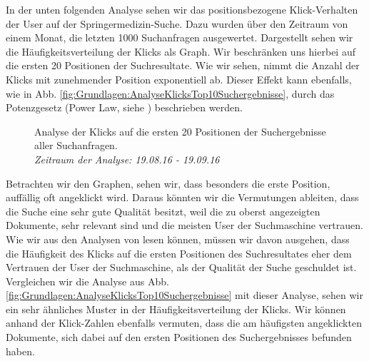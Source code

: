 
In der unten folgenden Analyse sehen wir das positionsbezogene Klick-Verhalten der User auf der Springermedizin-Suche. Dazu wurden über den Zeitraum von einem Monat, die letzten 1000 Suchanfragen ausgewertet. Dargestellt sehen wir die Häufigkeitsverteilung der Klicks als Graph. Wir beschränken uns hierbei auf die ersten 20 Positionen der Suchresultate. Wie wir sehen, nimmt die Anzahl der Klicks mit zunehmender Position exponentiell ab. Dieser Effekt kann ebenfalls, wie in Abb. \ref{fig:Grundlagen:AnalyseKlicksTop10Suchergebnisse}, durch das Potenzgesetz (Power Law, siehe \cite{PowerLaw}) beschrieben werden. 

\begin{figure}[H]
\centering 
\vspace{-1em}
\caption[Analyse der Klicks auf die ersten 20 Positionen der Suchergebnisse aller Suchanfragen. \textit{Zeitraum der Analyse: 19.08.16 - 19.09.16}]{Analyse der Klicks auf die ersten 20 Positionen der Suchergebnisse aller Suchanfragen. \\ \textit{Zeitraum der Analyse: 19.08.16 - 19.09.16}}
\label{fig:Grundlage:AnalyseKlicksPositionen}

\footnotesize
{}\topRanks
  

\vspace{-2em}
\end{figure}

Betrachten wir den Graphen, sehen wir, dass besonders die erste Position, auffällig oft angeklickt wird. Daraus könnten wir die Vermutungen ableiten, dass die Suche eine sehr gute Qualität besitzt, weil die zu oberst angezeigten Dokumente, sehr relevant sind und die meisten User der Suchmaschine vertrauen. Wie wir aus den Analysen von \cite{Joachims} lesen können, müssen wir davon ausgehen, dass die Häufigkeit des Klicks auf die ersten Positionen des Suchresultates eher dem Vertrauen der User der Suchmaschine, als der Qualität der Suche geschuldet ist. Vergleichen wir die Analyse aus Abb. \ref{fig:Grundlagen:AnalyseKlicksTop10Suchergebnisse} mit dieser Analyse, sehen wir ein sehr ähnliches Muster in der Häufigkeitsverteilung der Klicks. Wir können anhand der Klick-Zahlen ebenfalls vermuten, dass die am häufigsten angeklickten Dokumente, sich dabei auf den ersten Positionen des Suchergebnisses befunden haben.